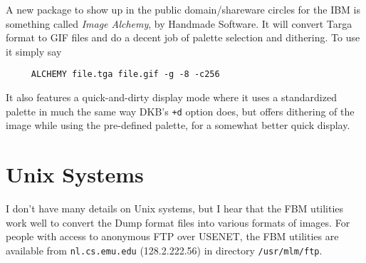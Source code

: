 A new package to show up in the public domain/shareware circles for the IBM
is something called {\em Image Alchemy}, by
Handmade Software.  It will convert
Targa format to GIF files and do a decent
job of palette selection and dithering.  To use it simply say
\begin{verbatim}
     ALCHEMY file.tga file.gif -g -8 -c256
\end{verbatim}
It also features a quick-and-dirty display mode where it uses a
standardized palette in much the same way DKB's {\tt +d} option does,
but offers dithering of the image while using the pre-defined palette,
for a somewhat better quick display.

\section{Unix Systems}

I don't have many details on Unix systems, but I hear that the
FBM utilities
work well to convert the Dump format files into various formats of images.
For people with access to anonymous FTP over USENET, the FBM utilities are
available from {\tt nl.cs.emu.edu} (128.2.222.56) in directory
{\tt /usr/mlm/ftp}.
